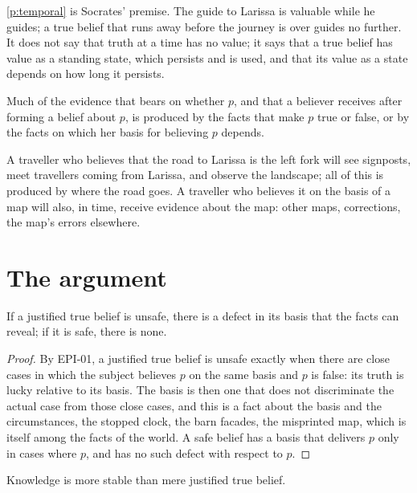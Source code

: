 \documentclass{situationist-preprint}
\begin{document}
\ref{p:temporal} is Socrates' premise. The guide to Larissa is valuable while he guides; a true belief that runs away before the journey is over guides no further. It does not say that truth at a time has no value; it says that a true belief has value as a standing state, which persists and is used, and that its value as a state depends on how long it persists.

\begin{assumption}\label{a:produce}
Much of the evidence that bears on whether $p$, and that a believer receives after forming a belief about $p$, is produced by the facts that make $p$ true or false, or by the facts on which her basis for believing $p$ depends.
\end{assumption}

A traveller who believes that the road to Larissa is the left fork will see signposts, meet travellers coming from Larissa, and observe the landscape; all of this is produced by where the road goes. A traveller who believes it on the basis of a map will also, in time, receive evidence about the map: other maps, corrections, the map's errors elsewhere.

\section{The argument}

\begin{lemma}[Exposure]\label{l:exposure}
If a justified true belief is unsafe, there is a defect in its basis that the facts can reveal; if it is safe, there is none.
\end{lemma}

\begin{proof}
By EPI-01, a justified true belief is unsafe exactly when there are close cases in which the subject believes $p$ on the same basis and $p$ is false: its truth is lucky relative to its basis. The basis is then one that does not discriminate the actual case from those close cases, and this is a fact about the basis and the circumstances, the stopped clock, the barn facades, the misprinted map, which is itself among the facts of the world. A safe belief has a basis that delivers $p$ only in cases where $p$, and has no such defect with respect to $p$.
\end{proof}

\begin{theorem}[Stability]\label{t:stab}
Knowledge is more stable than mere justified true belief.
\end{theorem}
\end{document}
